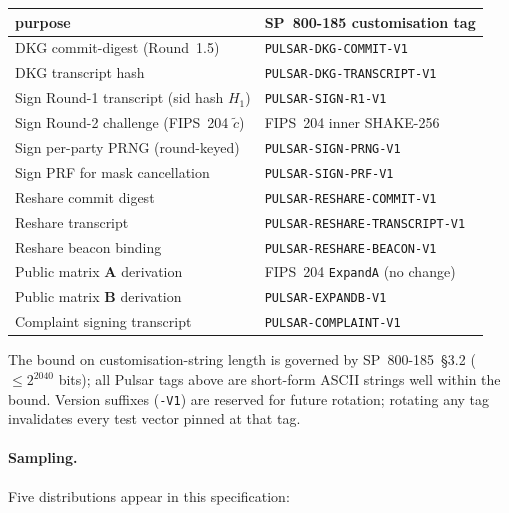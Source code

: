 \documentclass[11pt,a4paper]{article}
\theoremstyle{definition}
\theoremstyle{remark}
\begin{document}
\begin{center}\small
\begin{tabular}{l l}
\toprule
purpose & SP~800-185 customisation tag \\
\midrule
DKG commit-digest (Round~1.5)            & \texttt{PULSAR-DKG-COMMIT-V1} \\
DKG transcript hash                       & \texttt{PULSAR-DKG-TRANSCRIPT-V1} \\
Sign Round-1 transcript (sid hash $H_1$)  & \texttt{PULSAR-SIGN-R1-V1} \\
Sign Round-2 challenge (FIPS~204 $\tilde c$) & FIPS~204 inner SHAKE-256 \\
Sign per-party PRNG (round-keyed)         & \texttt{PULSAR-SIGN-PRNG-V1} \\
Sign PRF for mask cancellation            & \texttt{PULSAR-SIGN-PRF-V1} \\
Reshare commit digest                      & \texttt{PULSAR-RESHARE-COMMIT-V1} \\
Reshare transcript                         & \texttt{PULSAR-RESHARE-TRANSCRIPT-V1} \\
Reshare beacon binding                     & \texttt{PULSAR-RESHARE-BEACON-V1} \\
Public matrix $\mathbf{A}$ derivation       & FIPS~204 \texttt{ExpandA} (no change) \\
Public matrix $\mathbf{B}$ derivation       & \texttt{PULSAR-EXPANDB-V1} \\
Complaint signing transcript               & \texttt{PULSAR-COMPLAINT-V1} \\
\bottomrule
\end{tabular}
\end{center}

The bound on customisation-string length is governed by
SP~800-185~\S3.2 ($\le 2^{2040}$ bits); all Pulsar tags above are
short-form ASCII strings well within the bound. Version
suffixes (\texttt{-V1}) are reserved for future rotation; rotating any
tag invalidates every test vector pinned at that tag.

\paragraph{Sampling.} Five distributions appear in this specification:
\end{document}
